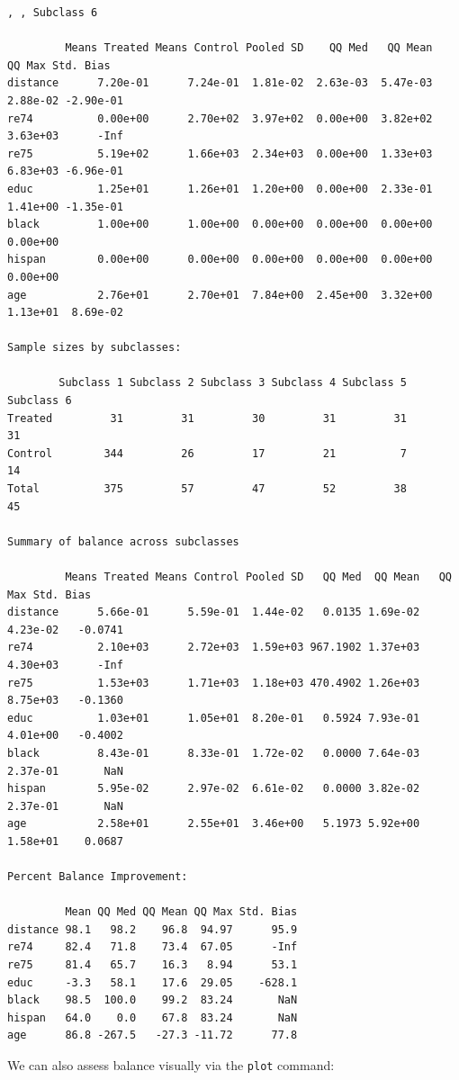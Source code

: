 \documentclass[oneside,letterpaper,titlepage]{article}
\begin{document}
\begin{verbatim}
, , Subclass 6

         Means Treated Means Control Pooled SD    QQ Med   QQ Mean    QQ Max Std. Bias
distance      7.20e-01      7.24e-01  1.81e-02  2.63e-03  5.47e-03  2.88e-02 -2.90e-01
re74          0.00e+00      2.70e+02  3.97e+02  0.00e+00  3.82e+02  3.63e+03      -Inf
re75          5.19e+02      1.66e+03  2.34e+03  0.00e+00  1.33e+03  6.83e+03 -6.96e-01
educ          1.25e+01      1.26e+01  1.20e+00  0.00e+00  2.33e-01  1.41e+00 -1.35e-01
black         1.00e+00      1.00e+00  0.00e+00  0.00e+00  0.00e+00  0.00e+00          
hispan        0.00e+00      0.00e+00  0.00e+00  0.00e+00  0.00e+00  0.00e+00          
age           2.76e+01      2.70e+01  7.84e+00  2.45e+00  3.32e+00  1.13e+01  8.69e-02
        
Sample sizes by subclasses:

        Subclass 1 Subclass 2 Subclass 3 Subclass 4 Subclass 5 Subclass 6
Treated         31         31         30         31         31         31
Control        344         26         17         21          7         14
Total          375         57         47         52         38         45

Summary of balance across subclasses

         Means Treated Means Control Pooled SD   QQ Med  QQ Mean   QQ Max Std. Bias
distance      5.66e-01      5.59e-01  1.44e-02   0.0135 1.69e-02 4.23e-02   -0.0741
re74          2.10e+03      2.72e+03  1.59e+03 967.1902 1.37e+03 4.30e+03      -Inf
re75          1.53e+03      1.71e+03  1.18e+03 470.4902 1.26e+03 8.75e+03   -0.1360
educ          1.03e+01      1.05e+01  8.20e-01   0.5924 7.93e-01 4.01e+00   -0.4002
black         8.43e-01      8.33e-01  1.72e-02   0.0000 7.64e-03 2.37e-01       NaN
hispan        5.95e-02      2.97e-02  6.61e-02   0.0000 3.82e-02 2.37e-01       NaN
age           2.58e+01      2.55e+01  3.46e+00   5.1973 5.92e+00 1.58e+01    0.0687
        
Percent Balance Improvement:

         Mean QQ Med QQ Mean QQ Max Std. Bias
distance 98.1   98.2    96.8  94.97      95.9
re74     82.4   71.8    73.4  67.05      -Inf
re75     81.4   65.7    16.3   8.94      53.1
educ     -3.3   58.1    17.6  29.05    -628.1
black    98.5  100.0    99.2  83.24       NaN
hispan   64.0    0.0    67.8  83.24       NaN
age      86.8 -267.5   -27.3 -11.72      77.8
\end{verbatim}
We can also assess balance visually via the \texttt{plot} command: 
\end{document}
